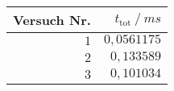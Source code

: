 \begin{tabular}{rr}
	\toprule
	Versuch Nr. & $t_{\mathrm{tot}} ~/~ \si{ms}$\\
	\midrule
	$1$ & $0{,}0561175$\\
	$2$ & $0{,}133589$\\
	$3$ & $0{,}101034$\\
	\bottomrule
\end{tabular}